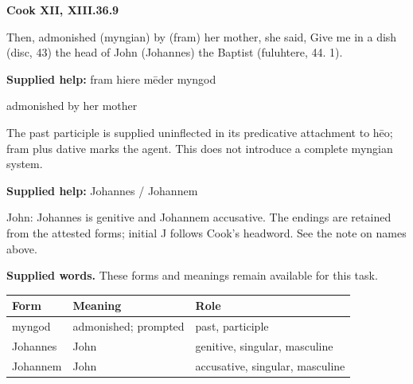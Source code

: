\par\begin{minipage}{\linewidth}\raggedright
\textbf{Cook XII, XIII.36.9}

Then, admonished (myngian) by (fram) her mother, she said, Give me in a dish (disc, 43) the head of John (Johannes) the Baptist (fuluhtere, 44. 1).

\textbf{Supplied help:} fram hiere mēder myngod

admonished by her mother

The past participle is supplied uninflected in its predicative attachment to hēo; fram plus dative marks the agent. This does not introduce a complete myngian system.

\textbf{Supplied help:} Johannes /\allowbreak{} Johannem

John: Johannes is genitive and Johannem accusative. The endings are retained from the attested forms; initial J follows Cook’s headword. See the note on names above.

\end{minipage}\par\addvspace{4pt}

\textbf{Supplied words.} These forms and meanings remain available for this task.

\par\begingroup
\fontsize{10.5}{13.2}\selectfont
\setlength{\LTleft}{0pt}\setlength{\LTright}{\fill}
\noindent
\begin{tabular}{@{}>{\raggedright\arraybackslash}p{26.28mm}>{\raggedright\arraybackslash}p{39.55mm}>{\raggedright\arraybackslash}p{52.55mm}@{}}
\toprule
\textbf{Form} & \textbf{Meaning} & \textbf{Role} \\
\midrule
myngod & admonished; prompted & past, participle \\
Johannes & John & genitive, singular, masculine \\
Johannem & John & accusative, singular, masculine \\
\bottomrule
\end{tabular}
\par\endgroup

